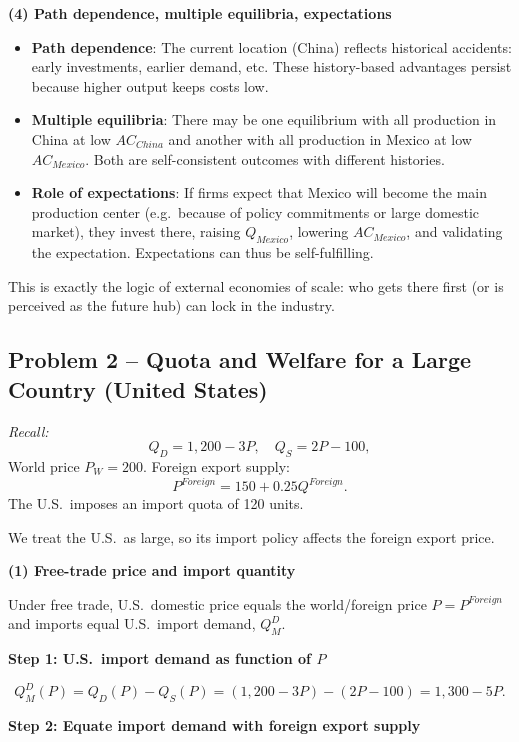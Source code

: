 \documentclass[12pt]{article}
\begin{document}
\textbf{(4) Path dependence, multiple equilibria, expectations}

\begin{itemize}
\item \textbf{Path dependence}: The current location (China) reflects historical accidents: early investments, earlier demand, etc. These history-based advantages persist because higher output keeps costs low.
\item \textbf{Multiple equilibria}: There may be one equilibrium with all production in China at low $AC_{China}$ and another with all production in Mexico at low $AC_{Mexico}$. Both are self-consistent outcomes with different histories.
\item \textbf{Role of expectations}: If firms expect that Mexico will become the main production center (e.g.\ because of policy commitments or large domestic market), they invest there, raising $Q_{Mexico}$, lowering $AC_{Mexico}$, and validating the expectation. Expectations can thus be self-fulfilling.
\end{itemize}

This is exactly the logic of external economies of scale: who gets there first (or is perceived as the future hub) can lock in the industry.

\vspace{1em}
\newpage

\subsection*{Problem 2 – Quota and Welfare for a Large Country (United States)}

\emph{Recall:}
\[
Q_D = 1{,}200 - 3P,\quad
Q_S = 2P - 100,
\]
World price $P_W = 200$. Foreign export supply:
\[
P^{Foreign} = 150 + 0.25Q^{Foreign}.
\]
The U.S.\ imposes an import quota of 120 units.

We treat the U.S.\ as large, so its import policy affects the foreign export price.

\textbf{(1) Free-trade price and import quantity}

Under free trade, U.S.\ domestic price equals the world/foreign price $P = P^{Foreign}$ and imports equal U.S.\ import demand, $Q_M^D$.

\textbf{Step 1: U.S.\ import demand as function of $P$}

\[
Q_M^D(P) = Q_D(P) - Q_S(P)
= (1{,}200 - 3P) - (2P - 100)
= 1{,}300 - 5P.
\]

\textbf{Step 2: Equate import demand with foreign export supply}
\end{document}
